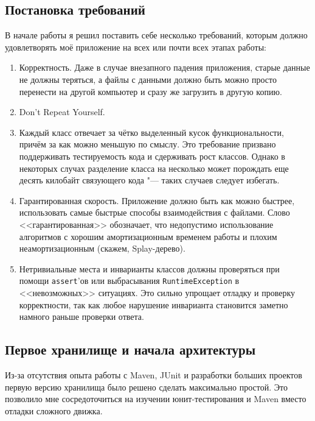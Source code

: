 \documentclass[a4paper]{article}
\renewcommand{\t}{\texttt}
\begin{document}
\subsection{Постановка требований}
  В начале работы я решил поставить себе несколько требований, которым должно удовлетворять моё приложение
  на всех или почти всех этапах работы:

  \begin{enumerate}
  \item Корректность. Даже в случае внезапного падения приложения, старые данные не должны теряться, а
        файлы с данными должно быть можно просто перенести на другой компьютер и сразу же загрузить в 
        другую копию.
  \item Don't Repeat Yourself.
  \item Каждый класс отвечает за чётко выделенный кусок функциональности, причём за как можно меньшую по смыслу.
        Это требование призвано поддерживать тестируемость кода и сдерживать рост классов. Однако в
        некоторых случах разделение класса на несколько может порождать еще десять килобайт связующего
        кода "--- таких случаев следует избегать.
  \item Гарантированная скорость. Приложение должно быть как можно быстрее, использовать самые быстрые способы взаимодействия
        с файлами. Слово <<гарантированная>> обозначает, что недопустимо использование
        алгоритмов с хорошим амортизационным временем работы и плохим неамортизационным (скажем,
        Splay-дерево).
  \item Нетривиальные места и инварианты классов должны проверяться при помощи \t{assert}'ов или
        выбрасывания \t{RuntimeException} в <<невозможных>> ситуациях. Это сильно упрощает
        отладку и проверку корректности, так как любое нарушение инварианта становится заметно намного
        раньше проверки ответа.
  \end{enumerate}

\subsection{Первое хранилище и начала архитектуры}
  Из-за отсутствия опыта работы с Maven, JUnit и разработки больших проектов
  первую версию хранилища было решено сделать максимально простой. Это позволило мне сосредоточиться
  на изучении юнит-тестирования и Maven вместо отладки сложного движка.
\end{document}
